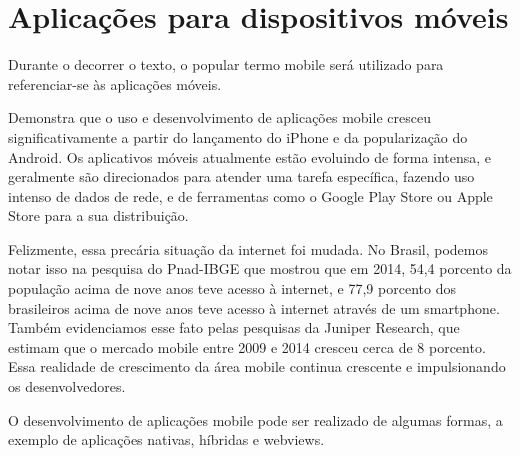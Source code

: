 \section{Aplicações para dispositivos móveis}\label{sec:apps_mobile}


Durante o decorrer o texto, o popular termo mobile será utilizado para referenciar-se às aplicações móveis. 


\cite{6248786} Demonstra que o uso e desenvolvimento de aplicações mobile cresceu significativamente a partir do lançamento do iPhone e da popularização do Android. Os aplicativos móveis atualmente estão  evoluindo de forma intensa, e geralmente são direcionados para atender uma tarefa específica, fazendo uso intenso de dados de rede, e  de ferramentas como o Google Play Store ou Apple Store para a sua distribuição.


Felizmente, essa precária situação da internet foi mudada. No Brasil, podemos notar isso na pesquisa do Pnad-IBGE que mostrou que em 2014, 54,4 porcento da população acima de nove anos teve acesso à internet, e 77,9 porcento dos brasileiros acima de nove anos teve acesso à internet através de um smartphone. Também evidenciamos esse fato pelas pesquisas da Juniper Research, que estimam que o mercado mobile entre 2009 e 2014 cresceu cerca de 8 porcento. Essa realidade de crescimento da área mobile continua crescente e impulsionando os desenvolvedores. 


O desenvolvimento de aplicações mobile pode ser realizado de algumas formas, a exemplo  de aplicações nativas, híbridas e webviews. 








